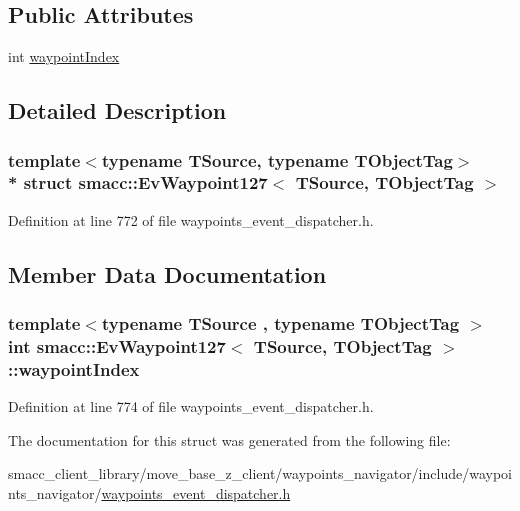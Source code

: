 \subsection*{Public Attributes}
\begin{DoxyCompactItemize}
\item 
int \hyperlink{structsmacc_1_1EvWaypoint127_a57e96e8639674847c452221c43e8aac9}{waypoint\+Index}
\end{DoxyCompactItemize}


\subsection{Detailed Description}
\subsubsection*{template$<$typename T\+Source, typename T\+Object\+Tag$>$\\*
struct smacc\+::\+Ev\+Waypoint127$<$ T\+Source, T\+Object\+Tag $>$}



Definition at line 772 of file waypoints\+\_\+event\+\_\+dispatcher.\+h.



\subsection{Member Data Documentation}
\subsubsection[{\texorpdfstring{waypoint\+Index}{waypointIndex}}]{\setlength{\rightskip}{0pt plus 5cm}template$<$typename T\+Source , typename T\+Object\+Tag $>$ int {\bf smacc\+::\+Ev\+Waypoint127}$<$ T\+Source, T\+Object\+Tag $>$\+::waypoint\+Index}\hypertarget{structsmacc_1_1EvWaypoint127_a57e96e8639674847c452221c43e8aac9}{}\label{structsmacc_1_1EvWaypoint127_a57e96e8639674847c452221c43e8aac9}


Definition at line 774 of file waypoints\+\_\+event\+\_\+dispatcher.\+h.



The documentation for this struct was generated from the following file\+:\begin{DoxyCompactItemize}
\item 
smacc\+\_\+client\+\_\+library/move\+\_\+base\+\_\+z\+\_\+client/waypoints\+\_\+navigator/include/waypoints\+\_\+navigator/\hyperlink{waypoints__event__dispatcher_8h}{waypoints\+\_\+event\+\_\+dispatcher.\+h}\end{DoxyCompactItemize}
